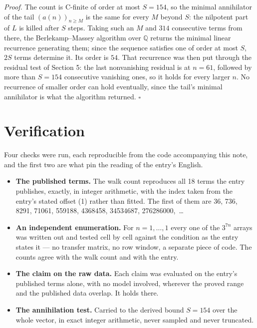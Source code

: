 \documentclass[11pt]{article}
\theoremstyle{definition}
\begin{document}
{\itshape Proof.} The count is C-finite of order at most $S = 154$, so the minimal annihilator of the tail $(a(n))_{n \ge M}$ is the same for every $M$ beyond $S$: the nilpotent part of $L$ is killed after $S$ steps. Taking such an $M$ and $314$ consecutive terms from there, the Berlekamp--Massey algorithm over $\mathbb{Q}$ returns the minimal linear recurrence generating them; since the sequence satisfies one of order at most $S$, $2S$ terms determine it. Its order is $54$. That recurrence was then put through the residual test of Section 5: the last nonvanishing residual is at $n = 61$, followed by more than $S = 154$ consecutive vanishing ones, so it holds for every larger $n$. No recurrence of smaller order can hold eventually, since the tail's minimal annihilator is what the algorithm returned. $\square$

\section{Verification}

Four checks were run, each reproducible from the code accompanying this note, and the first two are what pin the reading of the entry's English.

\begin{itemize}

\item {\bfseries The published terms.} The walk count reproduces all 18 terms the entry publishes, exactly, in integer arithmetic, with the index taken from the entry's stated offset (1) rather than fitted. The first of them are 36, 736, 8291, 71061, 559188, 4368458, 34534687, 276286000,~\dots

\item {\bfseries An independent enumeration.} For $n = 1,\dots,1$ every one of the $3^{7n}$ arrays was written out and tested cell by cell against the condition as the entry states it --- no transfer matrix, no row window, a separate piece of code. The counts agree with the walk count and with the entry.

\item {\bfseries The claim on the raw data.} Each claim was evaluated on the entry's published terms alone, with no model involved, wherever the proved range and the published data overlap. It holds there.

\item {\bfseries The annihilation test.} Carried to the derived bound $S = 154$ over the whole vector, in exact integer arithmetic, never sampled and never truncated.

\end{itemize}
\end{document}
